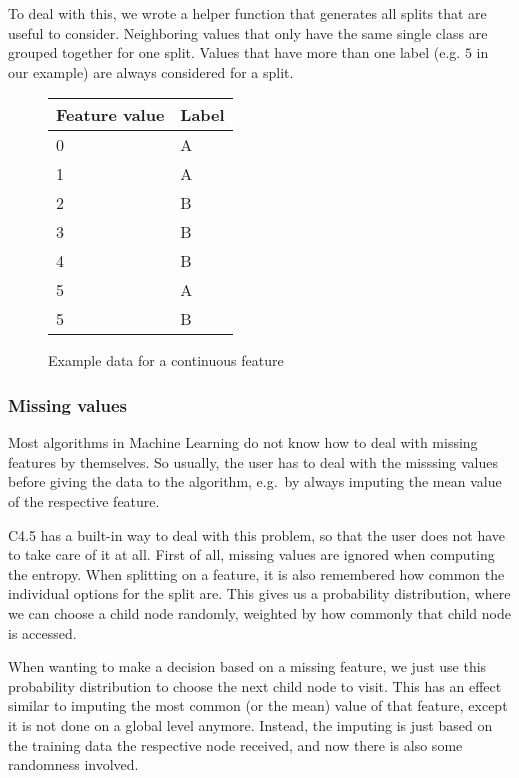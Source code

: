 \documentclass[a4paper]{article}
\begin{document}
To deal with this, we wrote a helper function that generates all splits that are useful to consider. Neighboring values that only have the same single class are grouped together for one split. Values that have more than one label (e.g. $5$ in our example) are always considered for a split.

\begin{figure}
	\centering
  \begin{tabular}{l|l}
      \textbf{Feature value} & \textbf{Label} \\
      \hline
      0 & A \\
      1 & A \\
      2 & B \\
      3 & B \\
      4 & B \\
      5 & A \\
      5 & B
  \end{tabular}

  \caption{Example data for a continuous feature}
  \label{fig:continuous-feature}
\end{figure}

\subsubsection{Missing values}

Most algorithms in Machine Learning do not know how to deal with missing features by themselves. So usually, the user has to deal with the misssing values before giving the data to the algorithm, e.g.\ by always imputing the mean value of the respective feature.

C4.5 has a built-in way to deal with this problem, so that the user does not have to take care of it at all. First of all, missing values are ignored when computing the entropy. When splitting on a feature, it is also remembered how common the individual options for the split are. This gives us a probability distribution, where we can choose a child node randomly, weighted by how commonly that child node is accessed.

When wanting to make a decision based on a missing feature, we just use this probability distribution to choose the next child node to visit. This has an effect similar to imputing the most common (or the mean) value of that feature, except it is not done on a global level anymore. Instead, the imputing is just based on the training data the respective node received, and now there is also some randomness involved.
\end{document}
